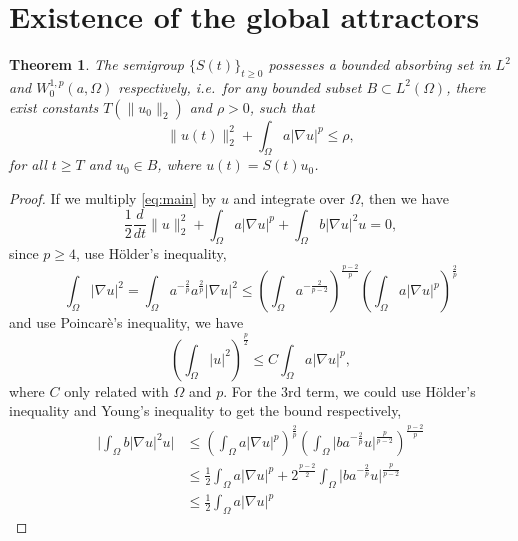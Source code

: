 \documentclass[11pt]{amsart}
\newtheorem{theorem}{Theorem}[section]
\theoremstyle{definition}
\numberwithin{equation}{section}
\newcommand*\abs[1]{\lvert#1\rvert}
\newcommand*\norm[1]{\lVert#1\rVert}
\newcommand*\Brace[1]{\lbrace#1\rbrace}
\begin{document}
\section{Existence of the global attractors}\label{sec:existence_of_the_global_attractors}
\begin{theorem}
	The semigroup $\Brace{S(t)}_{t \geq 0} $ possesses a bounded absorbing set in
	$L^2$ and $W_0^{1,p}(a,\Omega)$ respectively, i.e.\ for any bounded subset
	$B \subset L^2(\Omega)$, there exist constants $T(\norm{u_0}_2)$ and $\rho > 0$, such that
	\begin{equation}
		\norm{u(t)}_2^2 + \int_{\Omega}a\abs{\nabla u}^p \leq \rho,
	\end{equation}
	for all $t \geq T$ and $u_0 \in B$, where $u(t) = S(t)u_0$.
\end{theorem}
\begin{proof}
	If we multiply \cref{eq:main} by $u$ and integrate over $\Omega$,
	then we have
	\begin{equation}\label{eq:operate_u}
		\frac{1}{2}\frac{d}{dt}\norm{u}_2^2
		+ \int_\Omega a\abs{\nabla u}^p
		+ \int_\Omega b\abs{\nabla u}^2u = 0,
	\end{equation}
	since $p \geq 4$, use H\"older's inequality,
	\begin{equation}
			\int_{\Omega}\abs{\nabla u}^2
			= \int_{\Omega}a^{-\frac{2}{p}}a^{\frac{2}{p}}\abs{\nabla u}^2
			\leq \left(\int_{\Omega}a^{-\frac{2}{p-2}}\right)^{\frac{p-2}{p}}
			\left(\int_{\Omega}a\abs{\nabla u}^p\right)^{\frac{2}{p}}
	\end{equation}
	and use Poincar\`e's inequality, we have
	\begin{equation}
		\left(\int_{\Omega}\abs{u}^2\right)^{\frac{p}{2}}
		\leq C\int_{\Omega}a\abs{\nabla u}^p,
	\end{equation}
	where $C$ only related with $\Omega$ and $p$. For the 3rd term, we could use
	H\"older's inequality and Young's inequality to get the bound respectively,
	\begin{equation}\label{eq:absorb_damping_u}
		\begin{split}
			\abs{\int_{\Omega}b\abs{\nabla u}^2 u}
			&\leq \left(\int_{\Omega}a\abs{\nabla u}^p\right)^{\frac{2}{p}}
			\left(\int_{\Omega}\abs{b a^{-\frac{2}{p}} u}^{\frac{p}{p-2}}\right)^{\frac{p-2}{p}}\\
			&\leq \frac{1}{2}\int_{\Omega}a\abs{\nabla u}^p
			+ 2^{\frac{p-2}{2}}\int_{\Omega}\abs{b a^{-\frac{2}{p}} u}^{\frac{p}{p-2}}\\
			&\leq \frac{1}{2}\int_{\Omega}a\abs{\nabla u}^p

\end{split}
\end{equation}
\end{proof}
\end{document}
